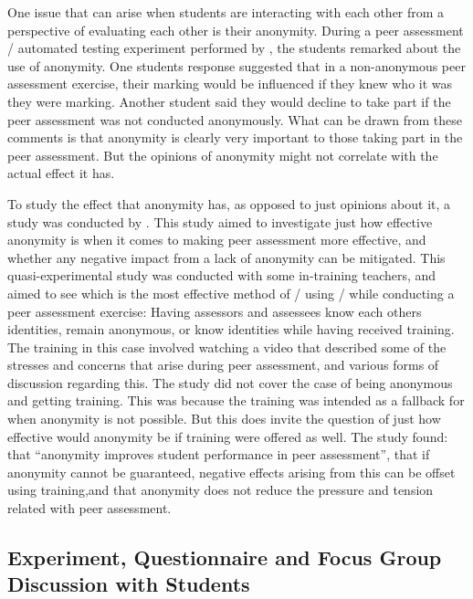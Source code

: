 \documentclass[sigplan,10pt,review]{acmart}\settopmatter{printfolios=true}
\begin{document}

One issue that can arise when students are interacting with each other
from a perspective of evaluating each other is their anonymity. During
a peer assessment / automated testing experiment performed by
\citet{sitthiworachart_effective_2004}, the students remarked about
the use of anonymity. One students response suggested that in a
non-anonymous peer assessment exercise, their marking would be
influenced if they knew who it was they were marking. Another student
said they would decline to take part if the peer assessment was not
conducted anonymously. What can be drawn from these comments is that
anonymity is clearly very important to those taking part in the peer
assessment. But the opinions of anonymity might not correlate with the
actual effect it has.

To study the effect that anonymity has, as opposed to just opinions
about it, a study was conducted by \citet{li_role_2016}. This study
aimed to investigate just how effective anonymity is when it comes to
making peer assessment more effective, and whether any negative impact
from a lack of anonymity can be mitigated.
%
This quasi-experimental study was conducted with some in-training
teachers, and aimed to see which is the most effective method of /
using / while conducting a peer assessment exercise: Having assessors
and assessees know each others identities, remain anonymous, or know
identities while having received training. The training in this case
involved watching a video that described some of the stresses and
concerns that arise during peer assessment, and various forms of
discussion regarding this.
%
The study did not cover the case of being anonymous and getting
training. This was because the training was intended as a fallback for
when anonymity is not possible. But this does invite the question of
just how effective would anonymity be if training were offered as
well.
%
The study found: that ``anonymity improves student performance in peer
assessment'', that if anonymity cannot be guaranteed, negative effects
arising from this can be offset using training,and that anonymity does
not reduce the pressure and tension related with peer assessment.



\subsection{Experiment, Questionnaire and Focus Group Discussion with Students}
\end{document}
